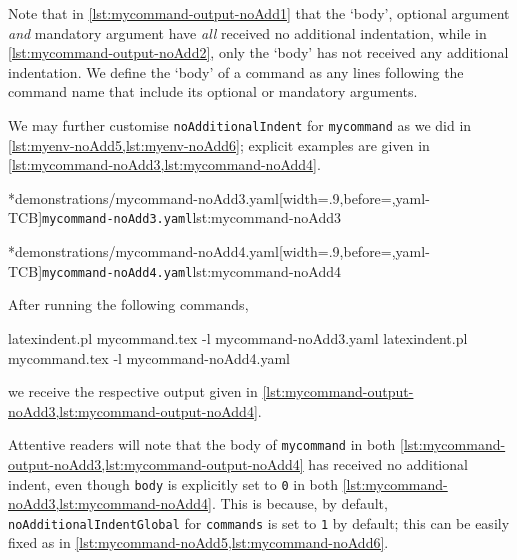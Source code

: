 	Note that in \cref{lst:mycommand-output-noAdd1} that the `body', optional argument
	\emph{and} mandatory argument have \emph{all} received no
	additional indentation, while in \cref{lst:mycommand-output-noAdd2}, only the `body' has not received
	any additional indentation. We define the `body' of a command as any lines following the
	command name that include its optional or mandatory arguments.

	We may further customise \texttt{noAdditionalIndent} for \texttt{mycommand} as we did in
	\vref{lst:myenv-noAdd5,lst:myenv-noAdd6}; explicit examples are given in \cref{lst:mycommand-noAdd3,lst:mycommand-noAdd4}.

	\begin{minipage}{.45\textwidth}
		\cmhlistingsfromfile[style=yaml-LST]*{demonstrations/mycommand-noAdd3.yaml}[width=.9\linewidth,before=\centering,yaml-TCB]{\texttt{mycommand-noAdd3.yaml}}{lst:mycommand-noAdd3}
	\end{minipage}
	\hfill
	\begin{minipage}{.45\textwidth}
		\cmhlistingsfromfile[style=yaml-LST]*{demonstrations/mycommand-noAdd4.yaml}[width=.9\linewidth,before=\centering,yaml-TCB]{\texttt{mycommand-noAdd4.yaml}}{lst:mycommand-noAdd4}
	\end{minipage}

	After running the following commands,
	\begin{commandshell}
latexindent.pl mycommand.tex -l mycommand-noAdd3.yaml  
latexindent.pl mycommand.tex -l mycommand-noAdd4.yaml  
\end{commandshell}
	we receive the respective output given in \cref{lst:mycommand-output-noAdd3,lst:mycommand-output-noAdd4}.

	\begin{minipage}{.45\textwidth}
	\end{minipage}
	\hfill
	\begin{minipage}{.45\textwidth}
	\end{minipage}

	Attentive readers will note that the body of \texttt{mycommand} in both
	\cref{lst:mycommand-output-noAdd3,lst:mycommand-output-noAdd4} has received no additional indent, even though
	\texttt{body} is explicitly set to \texttt{0} in both
	\cref{lst:mycommand-noAdd3,lst:mycommand-noAdd4}. This is because, by default, \texttt{noAdditionalIndentGlobal} for
	\texttt{commands} is set to \texttt{1} by default; this can be easily
	fixed as in \cref{lst:mycommand-noAdd5,lst:mycommand-noAdd6}.\label{page:command:noAddGlobal}

